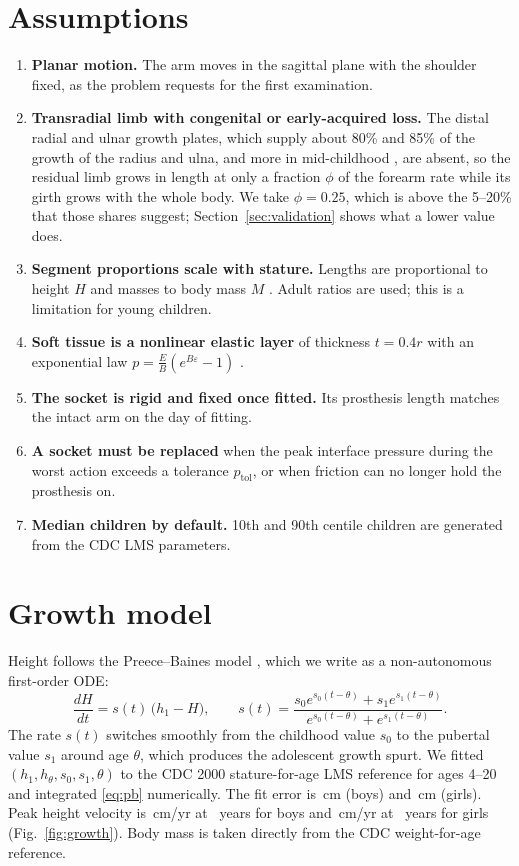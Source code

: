 \documentclass[11pt]{article}
\begin{document}
\section{Assumptions}
\begin{enumerate}
\item \textbf{Planar motion.} The arm moves in the sagittal plane with the shoulder fixed, as the problem requests for the first examination.
\item \textbf{Transradial limb with congenital or early-acquired loss.} The distal radial and ulnar growth plates, which supply about 80\% and 85\% of the growth of the radius and ulna, and more in mid-childhood \citep{pritchett1991}, are absent, so the residual limb grows in length at only a fraction $\phi$ of the forearm rate while its girth grows with the whole body. We take $\phi=0.25$, which is above the 5--20\% that those shares suggest; Section~\ref{sec:validation} shows what a lower value does.
\item \textbf{Segment proportions scale with stature.} Lengths are proportional to height $H$ and masses to body mass $M$ \citep{winter2009}. Adult ratios are used; this is a limitation for young children.
\item \textbf{Soft tissue is a nonlinear elastic layer} of thickness $t=0.4r$ with an exponential law $p=\tfrac{E}{B}(e^{B\varepsilon}-1)$ \citep{fung1993}.
\item \textbf{The socket is rigid and fixed once fitted.} Its prosthesis length matches the intact arm on the day of fitting.
\item \textbf{A socket must be replaced} when the peak interface pressure during the worst action exceeds a tolerance $p_{\mathrm{tol}}$, or when friction can no longer hold the prosthesis on.
\item \textbf{Median children by default.} 10th and 90th centile children are generated from the CDC LMS parameters.
\end{enumerate}

\section{Growth model}\label{sec:growth}
Height follows the Preece--Baines model \citep{preece1978}, which we write as a non-autonomous first-order ODE:
\begin{equation}
\frac{dH}{dt}=s(t)\,\bigl(h_1-H\bigr),\qquad
s(t)=\frac{s_0e^{s_0(t-\theta)}+s_1e^{s_1(t-\theta)}}{e^{s_0(t-\theta)}+e^{s_1(t-\theta)}}.
\label{eq:pb}
\end{equation}
The rate $s(t)$ switches smoothly from the childhood value $s_0$ to the pubertal value $s_1$ around age $\theta$, which produces the adolescent growth spurt. We fitted $(h_1,h_\theta,s_0,s_1,\theta)$ to the CDC 2000 stature-for-age LMS reference \citep{kuczmarski2002} for ages 4--20 and integrated \eqref{eq:pb} numerically. The fit error is \pbRmseBoy\,cm (boys) and \pbRmseGirl\,cm (girls). Peak height velocity is \phvBoy\,cm/yr at \phvAgeBoy\ years for boys and \phvGirl\,cm/yr at \phvAgeGirl\ years for girls (Fig.~\ref{fig:growth}). Body mass is taken directly from the CDC weight-for-age reference.
\end{document}
